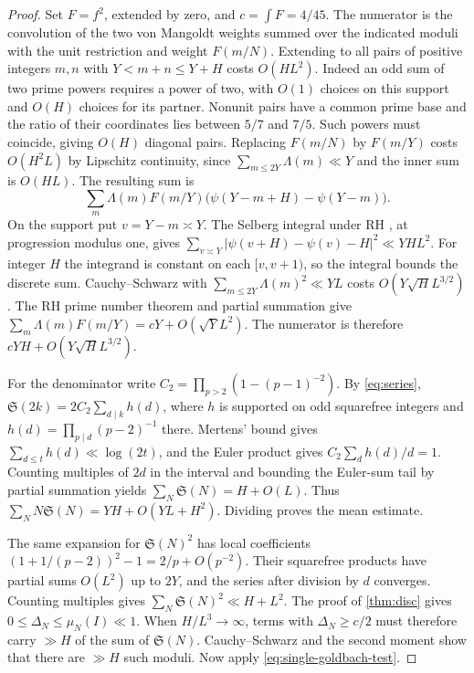 \documentclass[11pt,a4paper]{article}
\numberwithin{equation}{section}
\newcommand{\SSS}{\mathfrak S}
\begin{document}
\begin{proof}
Set $F=f^2$, extended by zero, and $c=\int F=4/45$. The numerator
is the convolution of the two von Mangoldt weights summed over
the indicated moduli with the unit restriction and weight $F(m/N)$.
Extending to all pairs of positive integers $m,n$ with $Y<m+n\le Y+H$
costs $O(HL^2)$. Indeed an odd sum of two prime powers requires a
power of two, with $O(1)$ choices on this support and $O(H)$ choices
for its partner. Nonunit pairs have a common prime base and the
ratio of their coordinates lies between $5/7$ and $7/5$. Such powers
must coincide, giving $O(H)$ diagonal pairs. Replacing $F(m/N)$ by
$F(m/Y)$ costs $O(H^2L)$ by Lipschitz continuity, since
$\sum_{m\le 2Y}\Lambda(m)\ll Y$ and the inner sum is $O(HL)$.
The resulting sum is
\[
 \sum_m \Lambda(m) F(m/Y)
       \bigl(\psi(Y-m+H)-\psi(Y-m)\bigr).
\]
On the support put $v=Y-m\asymp Y$. The Selberg integral under RH
\cite{PracharShort,GoldstonYildirimShort}, at progression modulus one,
gives $\sum_{v\asymp Y}|\psi(v+H)-\psi(v)-H|^2\ll YHL^2$.
For integer $H$ the integrand is constant on each $[v,v+1)$,
so the integral bounds the discrete sum. Cauchy--Schwarz with
$\sum_{m\le2Y}\Lambda(m)^2\ll YL$ costs $O(Y\sqrt H L^{3/2})$.
The RH prime number theorem and partial summation give
$\sum_m\Lambda(m)F(m/Y)=cY+O(\sqrt Y L^2)$.
The numerator is therefore $cYH+O(Y\sqrt H L^{3/2})$.

For the denominator write $C_2=\prod_{p>2}(1-(p-1)^{-2})$.
By \cref{eq:series}, $\SSS(2k)=2C_2\sum_{d\mid k}h(d)$, where
$h$ is supported on odd squarefree integers and
$h(d)=\prod_{p\mid d}(p-2)^{-1}$ there. Mertens' bound gives
$\sum_{d\le t}h(d)\ll\log(2t)$, and the Euler product gives
$C_2\sum_d h(d)/d=1$. Counting multiples of $2d$ in the interval
and bounding the Euler-sum tail by partial summation yields
$\sum_N\SSS(N)=H+O(L)$. Thus $\sum_N N\SSS(N)=YH+O(YL+H^2)$.
Dividing proves the mean estimate.

The same expansion for $\SSS(N)^2$ has local coefficients
$(1+1/(p-2))^2-1=2/p+O(p^{-2})$. Their squarefree products have
partial sums $O(L^2)$ up to $2Y$, and the series after division by
$d$ converges. Counting multiples gives $\sum_N\SSS(N)^2\ll H+L^2$.
The proof of \cref{thm:disc} gives $0\le\Delta_N\le\mu_N(I)\ll1$.
When $H/L^3\to\infty$, terms with $\Delta_N\ge c/2$ must therefore
carry $\gg H$ of the sum of $\SSS(N)$. Cauchy--Schwarz and the
second moment show that there are $\gg H$ such moduli.
Now apply \cref{eq:single-goldbach-test}.
\end{proof}
\end{document}
